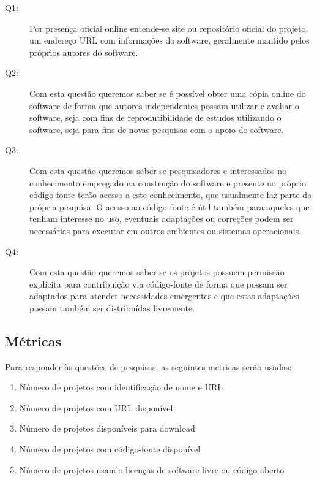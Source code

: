 \begin{description}
  \item [Q1:] \EstudoUmQuestaoUm

    Por presença oficial online entende-se site ou repositório oficial do
    projeto, um endereço URL com informações do software, geralmente mantido
    pelos próprios autores do software.

  \item [Q2:] \EstudoUmQuestaoDois

    Com esta questão queremos saber se é possível obter uma cópia online do
    software de forma que autores independentes possam utilizar e avaliar
    o software, seja com fins de reprodutibilidade de estudos utilizando o
    software, seja para fins de novas pesquisas com o apoio do software.

  \item [Q3:] \EstudoUmQuestaoTres

    Com esta questão queremos saber se pesquisadores e interessados no conhecimento
    empregado na construção do software e presente no próprio código-fonte terão acesso
    a este conhecimento, que usualmente faz parte da própria pesquisa. O acesso
    ao código-fonte é útil também para aqueles que tenham interesse no uso, eventuais
    adaptações ou correções podem ser necessárias para executar em outros ambientes
    ou sistemas operacionais.

  \item [Q4:] \EstudoUmQuestaoQuatro

    Com esta questão queremos saber se os projetos possuem permissão explícita
    para contribuição via código-fonte de forma que possam ser adaptados para
    atender necessidades emergentes e que estas adaptações possam também ser
    distribuídas livremente.
\end{description}

\subsection{Métricas}

Para responder às questões de pesquisas, as seguintes métricas serão usadas:

\begin{enumerate}
  \item Número de projetos com identificação de nome e URL
  \item Número de projetos com URL disponível
  \item Número de projetos disponíveis para download
  \item Número de projetos com código-fonte disponível
  \item Número de projetos usando licenças de software livre ou código aberto
\end{enumerate}

